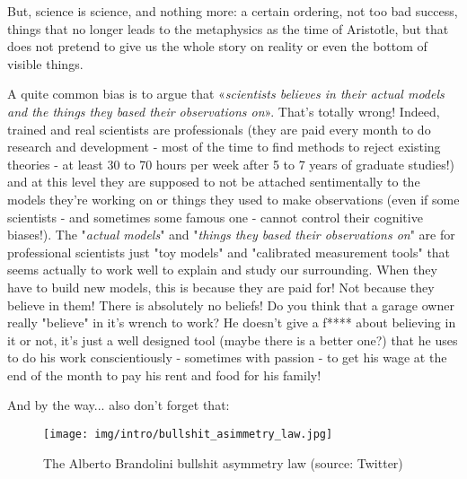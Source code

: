 	But, science is science, and nothing more: a certain ordering, not too bad success, things that no longer leads to the metaphysics as the time of Aristotle, but that does not pretend to give us the whole story on reality or even the bottom of visible things.
	\begin{center}
	\end{center}
	\begin{tcolorbox}[title=Remark,arc=10pt,breakable,drop lifted shadow,
  skin=enhanced,
  skin first is subskin of={enhancedfirst}{arc=10pt,no shadow},
  skin middle is subskin of={enhancedmiddle}{arc=10pt,no shadow},
  skin last is subskin of={enhancedlast}{drop lifted shadow}]
	A quite common bias is to argue that «\textit{scientists believes in their actual models and the things they based their observations on}». That's totally wrong! Indeed, trained and real scientists are professionals (they are paid every month to do research and development - most of the time to find methods to reject existing theories - at least 30 to 70 hours per week after 5 to 7 years of graduate studies!) and at this level they are supposed to not be attached sentimentally to the models they're working on or things they used to make observations (even if some scientists - and sometimes some famous one - cannot control their cognitive biases!). The "\textit{actual models}" and "\textit{things they based their observations on}" are for professional scientists just "toy models" and "calibrated measurement tools" that seems actually to work well to explain and study our surrounding. When they have to build new models, this is because they are paid for! Not because they believe in them! There is absolutely no beliefs! Do you think that a garage owner really "believe" in it's wrench to work? He doesn't give a f**** about believing in it or not, it's just a well designed tool (maybe there is a better one?) that he uses to do his work conscientiously - sometimes with passion - to get his wage at the end of the month to pay his rent and food for his family!
	\end{tcolorbox}
	And by the way... also don't forget that:
	\begin{figure}[H]
		\centering
		\texttt{[image: img/intro/bullshit\_asimmetry\_law.jpg]}
		\caption[The Alberto Brandolini bullshit asymmetry law]{The Alberto Brandolini bullshit asymmetry law (source: Twitter)}
	\end{figure}	

